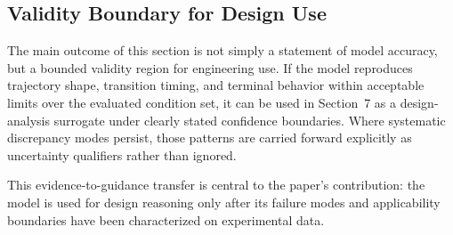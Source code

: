 \subsection{Validity Boundary for Design Use}

The main outcome of this section is not simply a statement of model accuracy, but a bounded validity region for engineering use. If the model reproduces trajectory shape, transition timing, and terminal behavior within acceptable limits over the evaluated condition set, it can be used in Section~7 as a design-analysis surrogate under clearly stated confidence boundaries. Where systematic discrepancy modes persist, those patterns are carried forward explicitly as uncertainty qualifiers rather than ignored.

This evidence-to-guidance transfer is central to the paper's contribution: the model is used for design reasoning only after its failure modes and applicability boundaries have been characterized on experimental data.
